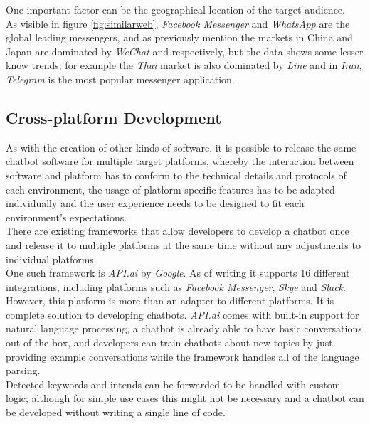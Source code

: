\label{geography}

One important factor can be the geographical location of the target audience.
\\
As visible in figure \ref{fig:similarweb}, \emph{Facebook Messenger} and \emph{WhatsApp} are the global leading messengers,
and as previously mention the markets in China and Japan are dominated by \emph{WeChat} and \emphLine respectively,
but the data shows some lesser know trends; for example the \emph{Thai} market is also dominated by\emph{ Line}
and in \emph{Iran}, \emph{Telegram} is the most popular messenger application.


\subsection{Cross-platform Development}
\label{crossplatform}

As with the creation of other kinds of software, it is possible to release the same chatbot software for multiple target platforms,
whereby the interaction between software and platform has to conform to the technical details and protocols of each environment, the usage of platform-specific features has to be adapted individually and the user experience needs to be designed to fit each environment's expectations.
\\

There are existing frameworks that allow developers to develop a chatbot once and release it to multiple platforms at the same time without any adjustments to individual platforms.
\\
One such framework is \emph{API.ai} by \emph{Google}.
As of writing it supports 16 different integrations, including platforms such as \emph{Facebook Messenger}, \emph{Skye} and \emph{Slack}\cite{apiai}.
However, this platform is more than an adapter to different platforms.
It is complete solution to developing chatbots.
\emph{API.ai} comes with built-in support for natural language processing,
a chatbot is already able to have basic conversations out of the box,
and developers can train chatbots about new topics by just providing example conversations while the framework handles all of the language parsing.
\\
Detected keywords and intends can be forwarded to be handled with custom logic;
although for simple use cases this might not be necessary and a chatbot can be developed without writing a single line of code.
\\


